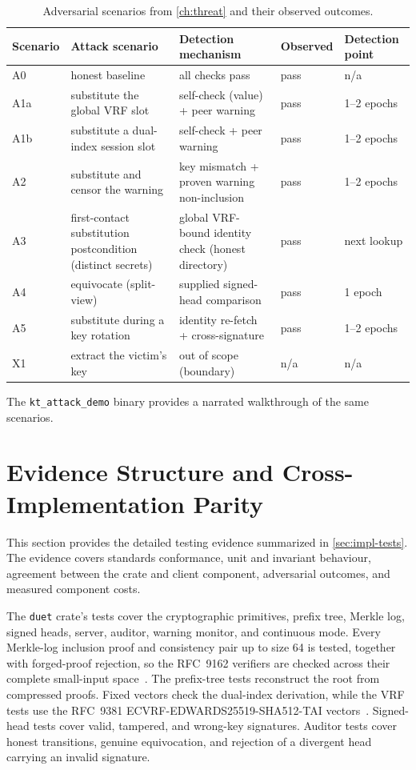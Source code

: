 \begin{table}[H]
\centering
\caption{Adversarial scenarios from \cref{ch:threat} and their observed outcomes.}
\label{tab:tests-adversarial}
\footnotesize
\begin{tabular}{@{}lp{3.6cm}p{4.4cm}ll@{}}
\toprule
Scenario & Attack scenario & Detection mechanism & Observed & Detection point \\
\midrule
A0 & honest baseline & all checks pass & pass & n/a \\
A1a & substitute the global VRF slot & self-check (value) + peer warning & pass & 1--2 epochs \\
A1b & substitute a dual-index session slot & self-check + peer warning & pass & 1--2 epochs \\
A2 & substitute and censor the warning & key mismatch + proven warning non-inclusion & pass & 1--2 epochs \\
A3 & first-contact substitution postcondition (distinct secrets) & global VRF-bound identity check (honest directory) & pass & next lookup \\
A4 & equivocate (split-view) & supplied signed-head comparison & pass & 1 epoch \\
A5 & substitute during a key rotation & identity re-fetch + cross-signature & pass & 1--2 epochs \\
X1 & extract the victim's key & out of scope (boundary) & n/a & n/a \\
\bottomrule
\end{tabular}
\end{table}

The \texttt{kt\_attack\_demo} binary provides a narrated walkthrough of the same scenarios.

\section{Evidence Structure and Cross-Implementation Parity}\label{sec:tests-evidence}

This section provides the detailed testing evidence summarized in \cref{sec:impl-tests}. The
evidence covers standards conformance, unit and invariant behaviour, agreement between the crate and
client component, adversarial outcomes, and measured component costs.

The \texttt{duet} crate's tests cover the cryptographic primitives, prefix tree, Merkle log, signed
heads, server, auditor, warning monitor, and continuous mode. Every Merkle-log inclusion proof and
consistency pair up to size 64 is tested, together with forged-proof rejection, so the RFC~9162
verifiers are checked across their complete small-input
space~\cite[Sections~2.1.3--2.1.4]{rfc9162}. The prefix-tree tests reconstruct the root from compressed
proofs. Fixed vectors check the dual-index derivation, while the VRF tests use the RFC~9381
ECVRF-EDWARDS25519-SHA512-TAI vectors~\cite[Appendix~B.3]{rfc9381}. Signed-head tests cover valid,
tampered, and wrong-key signatures. Auditor tests cover honest transitions, genuine equivocation,
and rejection of a divergent head carrying an invalid signature.

